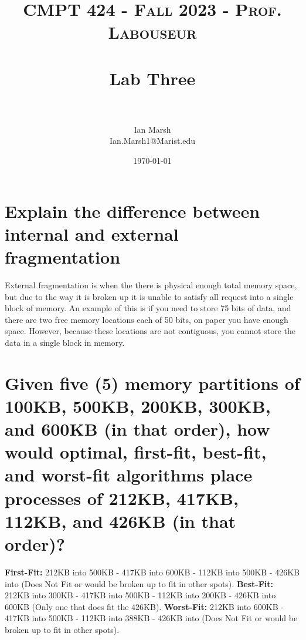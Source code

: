 \documentclass[10pt]{article}
\title{	
   \normalfont \normalsize 
   \textsc{CMPT 424 - Fall 2023 - Prof. Labouseur} \\[10pt] %
   \horrule{0.5pt} \\[0.25cm] 	%
   \huge Lab Three  \\     	    %
   \horrule{0.5pt} \\[0.25cm] 	%
}
\author{Ian Marsh \\ \normalsize Ian.Marsh1@Marist.edu}
\date{\normalsize\today} 	%
\begin{document}
\maketitle %

\maketitle

\section{Explain the difference between internal and external fragmentation}
External fragmentation is when the there is physical enough total memory space, but due to the way it is broken up it is unable to satisfy all request into a single block of memory. An example of this is if you need to store 75 bits of data, and there are two free memory locations each of 50 bits, on paper you have enough space. However, because these locations are not contiguous, you cannot store the data in a single block in memory.
\section{Given five (5) memory partitions of 100KB, 500KB, 200KB, 300KB, and 600KB (in that
order), how would optimal, first-fit, best-fit, and worst-fit algorithms place processes
of 212KB, 417KB, 112KB, and 426KB (in that order)?}
\textbf{First-Fit:} 
\newline
212KB into 500KB - 417KB into 600KB - 112KB into 500KB - 426KB into (Does Not Fit or would be broken up to fit in other spots). 
\newline
\newline
\textbf{Best-Fit:} 
212KB into 300KB - 417KB into 500KB - 112KB into 200KB - 426KB into 600KB (Only one that does fit the 426KB).
\newline
\newline
\textbf{Worst-Fit:} 
212KB into 600KB - 417KB into 500KB - 112KB into 388KB - 426KB into (Does Not Fit or would be broken up to fit in other spots). 
\end{document}
